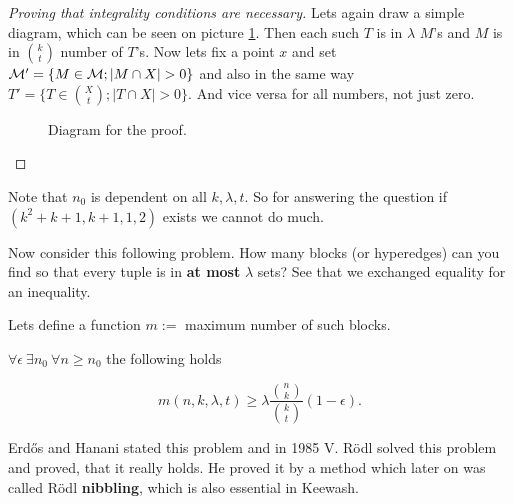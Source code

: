 \begin{proof}[Proving that integrality conditions are necessary]
	Lets again draw a simple diagram, which can be seen on picture \ref{nec-integr-cond}. Then each such $T$ is in $\lambda$ $M$'s and $M$ is in $\binom{k}{t}$ number of $T$'s. Now lets fix a point $x$ and set $\mathcal{M}' = \{M \in \mathcal{M}; |M \cap X| > 0\}$ and also in the same way $T' = \{T \in \binom{X}{t}; |T \cap X| > 0\}$. And vice versa for all numbers, not just zero.
	
	\begin{figure}[!ht]\centering
		\caption{Diagram for the proof.}
		\label{nec-integr-cond}
	\end{figure}
\end{proof}

Note that $n_0$ is dependent on all $k,\lambda,t$. So for answering the question if $(k^2 + k +1, k+1, 1, 2)$ exists we cannot do much.

Now consider this following problem. How many blocks (or hyperedges) can you find so that every tuple is in \textbf{at most} $\lambda$ sets? See that we exchanged equality for an inequality.

\begin{defn}
	Lets define a function $m :=$ maximum number of such blocks.
\end{defn}

\begin{thm}
	$\forall \epsilon \ \exists n_0 \ \forall n \geq n_0$  the following holds
	
	$$
	m(n,k,\lambda,t) \geq \lambda \frac{\binom{n}{k}}{\binom{k}{t}}(1 - \epsilon).
	$$
	\label{existence-of-partial-bibd}
\end{thm}

Erd\H os and Hanani stated this problem and in 1985 V. Rödl solved this problem and proved, that it really holds. He proved it by a method which later on was called Rödl \textbf{nibbling}, which is also essential in Keewash.


